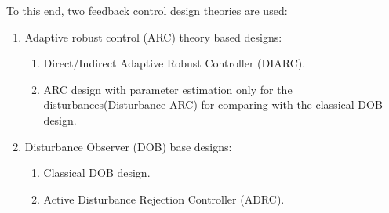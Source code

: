 To this end, two feedback control design theories are used:
\begin{enumerate}
    \item Adaptive robust control (ARC) theory based designs:
    \begin{enumerate}
        \item Direct/Indirect Adaptive Robust Controller (DIARC).
        \item ARC design with parameter estimation only for the disturbances(Disturbance ARC) for comparing with the classical DOB design.
    \end{enumerate}
    \item Disturbance Observer (DOB) base designs:
    \begin{enumerate}
        \item Classical DOB design.
        \item Active Disturbance Rejection Controller (ADRC).
    \end{enumerate}
\end{enumerate}
